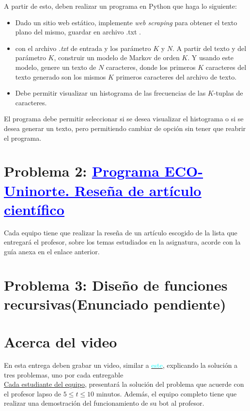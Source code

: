 A partir de esto, deben realizar un programa en Python que haga lo siguiente:
\begin{itemize}
\item Dado un sitio web estático, implemente \textit{web scraping} para obtener el texto plano del mismo, guardar en archivo .txt . 

    \item con el archivo \textit{.txt} de entrada y los parámetro $K$ y $N$. A partir del texto y del parámetro $K$, construir un modelo de Markov de orden $K$. Y usando este modelo, genere un texto de $N$ caracteres, donde los primeros $K$ caracteres del texto generado son los mismos $K$ primeros caracteres del archivo de texto.
    
    \item Debe permitir visualizar un histograma de las frecuencias de las $K$-tuplas de caracteres.
\end{itemize}
El programa debe permitir seleccionar si se desea visualizar el histograma o si se desea generar un texto, pero permitiendo cambiar de opción sin tener que reabrir el programa.


\section*{Problema 2: \href{https://drive.google.com/file/d/1Wm4aUHqS0DDWuOz9t9etSarpcEuvZ_2I/view?usp=drive_link}{\textbf{\textcolor{blue}{\underline{Programa ECO-Uninorte. Reseña de artículo científico}}}} }
Cada equipo tiene que realizar la reseña de un artículo escogido de la lista que entregará el profesor, sobre los temas estudiados en la asignatura, acorde con la guía anexa en el enlace anterior.

\section*{Problema 3: Diseño de funciones recursivas(Enunciado pendiente)}

\section*{Acerca del video}
En esta entrega deben grabar un video, similar a \href{https://www.youtube.com/watch?v=ox09Jko1ErM/}
{\textcolor{cyan}{este}}, explicando la solución a tres problemas, uno por cada entregable\\
\underline{Cada estudiante del equipo}, presentará la solución del problema que acuerde con el profesor lapso de $5\le t\le 10$ minutos. Además, el equipo completo tiene que realizar una demostración del funcionamiento de su bot al profesor.

